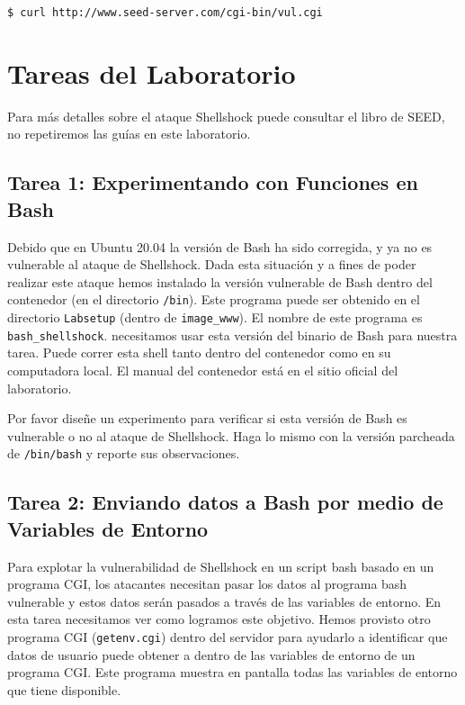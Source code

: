 \begin{lstlisting}
$ curl http://www.seed-server.com/cgi-bin/vul.cgi
\end{lstlisting}


\section{Tareas del Laboratorio}

Para más detalles sobre el ataque Shellshock puede consultar el libro de SEED, no repetiremos las guías en este laboratorio.

\subsection{Tarea 1: Experimentando con Funciones en Bash}

Debido que en Ubuntu 20.04 la versión de Bash ha sido corregida, y ya no es vulnerable al ataque de Shellshock. Dada esta situación y a fines de poder realizar este ataque hemos instalado la versión vulnerable de Bash dentro del contenedor (en el directorio  \texttt{/bin}). 
Este programa puede ser obtenido en el directorio \texttt{Labsetup} (dentro de \texttt{image\_www}). 
El nombre de este programa es \texttt{bash\_shellshock}. necesitamos usar esta versión del binario de Bash para nuestra tarea. Puede correr esta shell tanto dentro del contenedor como en su computadora local.
El manual del contenedor está en el sitio oficial del laboratorio.

Por favor diseñe un experimento para verificar si esta versión de Bash es vulnerable o no al ataque de Shellshock. Haga lo mismo con la versión parcheada de \texttt{/bin/bash} y reporte sus observaciones.


\subsection{Tarea 2: Enviando datos a Bash por medio de Variables de Entorno}

Para explotar la vulnerabilidad de Shellshock en un script bash basado en un programa CGI, los atacantes necesitan pasar los datos al programa bash vulnerable y estos datos serán pasados a través de las variables de entorno. En esta tarea necesitamos ver como logramos este objetivo. Hemos provisto otro programa CGI (\texttt{getenv.cgi}) dentro del servidor para ayudarlo a identificar que datos de usuario puede obtener a dentro de las variables de entorno de un programa CGI. Este programa muestra en pantalla todas las variables de entorno que tiene disponible.


